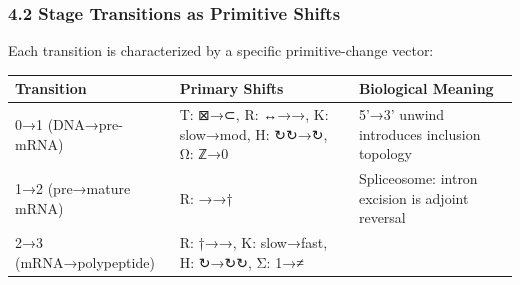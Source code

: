 \documentclass[12pt,a4paper]{article}
\begin{document}
\hypertarget{stage-transitions-as-primitive-shifts}{%
\subsubsection{4.2 Stage Transitions as Primitive
Shifts}\label{stage-transitions-as-primitive-shifts}}

Each transition is characterized by a specific primitive-change vector:

\begin{longtable}[]{@{}lll@{}}
\toprule
\begin{minipage}[b]{0.24\columnwidth}\raggedright
Transition\strut
\end{minipage} & \begin{minipage}[b]{0.30\columnwidth}\raggedright
Primary Shifts\strut
\end{minipage} & \begin{minipage}[b]{0.38\columnwidth}\raggedright
Biological Meaning\strut
\end{minipage}\tabularnewline
\midrule
\endhead
\begin{minipage}[t]{0.24\columnwidth}\raggedright
0→1 (DNA→pre-mRNA)\strut
\end{minipage} & \begin{minipage}[t]{0.30\columnwidth}\raggedright
T: ⊠→⊂, R: ↔→→, K: slow→mod, H: ↻↻→↻, Ω: ℤ→0\strut
\end{minipage} & \begin{minipage}[t]{0.38\columnwidth}\raggedright
5'→3' unwind introduces inclusion topology\strut
\end{minipage}\tabularnewline
\begin{minipage}[t]{0.24\columnwidth}\raggedright
1→2 (pre→mature mRNA)\strut
\end{minipage} & \begin{minipage}[t]{0.30\columnwidth}\raggedright
R: →→†\strut
\end{minipage} & \begin{minipage}[t]{0.38\columnwidth}\raggedright
Spliceosome: intron excision is adjoint reversal\strut
\end{minipage}\tabularnewline
\begin{minipage}[t]{0.24\columnwidth}\raggedright
2→3 (mRNA→polypeptide)\strut
\end{minipage} & \begin{minipage}[t]{0.30\columnwidth}\raggedright
R: †→→, K: slow→fast, H: ↻→↻↻, Σ: 1→≠\strut
\end{minipage} & \begin{minipage}[t]{0.38\columnwidth}\raggedright

\end{minipage}
\end{longtable}
\end{document}
